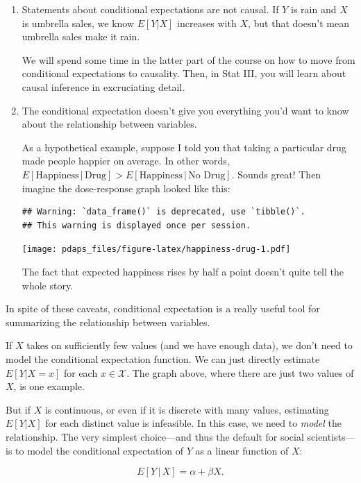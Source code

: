 \documentclass[12pt,oneside,openany]{book}
\begin{document}
\begin{enumerate}
\def\labelenumi{\arabic{enumi}.}
\item
  Statements about conditional expectations are not causal. If \(Y\) is
  rain and \(X\) is umbrella sales, we know \(E[Y | X]\) increases with
  \(X\), but that doesn't mean umbrella sales make it rain.

  We will spend some time in the latter part of the course on how to
  move from conditional expectations to causality. Then, in Stat III,
  you will learn about causal inference in excruciating detail.
\item
  The conditional expectation doesn't give you everything you'd want to
  know about the relationship between variables.

  As a hypothetical example, suppose I told you that taking a particular
  drug made people happier on average. In other words,
  \(E[\text{Happiness} \,|\, \text{Drug}] > E[\text{Happiness} \,|\, \text{No Drug}]\).
  Sounds great! Then imagine the dose-response graph looked like this:

\begin{verbatim}
## Warning: `data_frame()` is deprecated, use `tibble()`.
## This warning is displayed once per session.
\end{verbatim}

  \texttt{[image: pdaps\_files/figure-latex/happiness-drug-1.pdf]}

  The fact that expected happiness rises by half a point doesn't quite
  tell the whole story.
\end{enumerate}

In spite of these caveats, conditional expectation is a really useful
tool for summarizing the relationship between variables.

If \(X\) takes on sufficiently few values (and we have enough data), we
don't need to model the conditional expectation function. We can just
directly estimate \(E[Y | X = x]\) for each \(x \in \mathcal{X}\). The
graph above, where there are just two values of \(X\), is one example.

But if \(X\) is continuous, or even if it is discrete with many values,
estimating \(E[Y | X]\) for each distinct value is infeasible. In this
case, we need to \emph{model} the relationship. The very simplest
choice---and thus the default for social scientists---is to model the
conditional expectation of \(Y\) as a linear function of \(X\):

\begin{equation}
E[Y \,|\, X] = \alpha + \beta X.
\end{equation}
\end{document}
